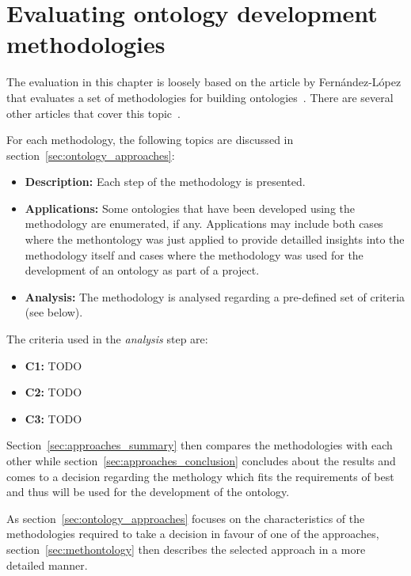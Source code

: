 \section{Evaluating ontology development methodologies}

The evaluation in this chapter is loosely based on the article by Fernández-López that evaluates a set of methodologies for building ontologies~\cite{MethodologyOverview}. There are several other articles that cover this topic~\cite{MethodologyComparison1,MethodologyComparison2,MethodologyComparison3}.

For each methodology, the following topics are discussed in section~\ref{sec:ontology_approaches}:

\begin{itemize}
  \item \textbf{Description:} Each step of the methodology is presented.
  
  \item \textbf{Applications:} Some ontologies that have been developed using the methodology are enumerated, if any. Applications may include both cases where the methontology was just applied to provide detailled insights into the methodology itself and cases where the methodology was used for the development of an ontology as part of a project.
  
  \item \textbf{Analysis:} The methodology is analysed regarding a pre-defined set of criteria (see below).
\end{itemize}

The criteria used in the \emph{analysis} step are:

\begin{itemize}
  \item \textbf{C1:} TODO
  
  \item \textbf{C2:} TODO
  
  \item \textbf{C3:} TODO
\end{itemize}

Section~\ref{sec:approaches_summary} then compares the methodologies with each other while section~\ref{sec:approaches_conclusion} concludes about the results and comes to a decision regarding the methology which fits the requirements of \thinkhomeweather best and thus will be used for the development of the ontology.

As section~\ref{sec:ontology_approaches} focuses on the characteristics of the methodologies required to take a decision in favour of one of the approaches, section~\ref{sec:methontology} then describes the selected approach in a more detailed manner.

